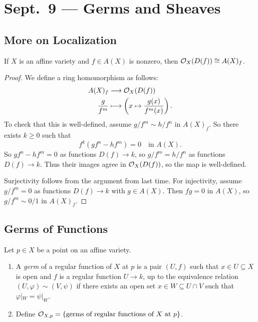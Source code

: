 \chapter{Sept.~9 --- Germs and Sheaves}

\section{More on Localization}
\begin{prop}
  If $X$ is an affine variety and
  $f \in A(X)$ is nonzero, then
  $\mathcal{O}_X(D(f)) \cong A(X)_f$.
\end{prop}

\begin{proof}
  We define a ring homomorphism as follows:
  \begin{align*}
    A(X)_f &\longrightarrow \mathcal{O}_X(D(f)) \\
    \frac{g}{f^m} &\longmapsto \left( x \mapsto \frac{g(x)}{f^m(x)} \right).
  \end{align*}
  To check that this is well-defined,
  assume $g / f^m \sim h / f^n$ in
  $A(X)_f$. So there exists $k \ge 0$
  such that
  \[
    f^k (g f^n - h f^m) = 0
    \quad \text{in } A(X).
  \]
  So $gf^n - hf^m = 0$ as functions
  $D(f) \to k$, so $g / f^m = h / f^n$
  as functions $D(f) \to k$. Thus
  their images agree in $\mathcal{O}_X(D(f))$, so
  the map is well-defined.

  Surjectivity follows from the argument
  from last time. For injectivity, assume
  $g / f^m = 0$ as functions
  $D(f) \to k$ with $g \in A(X)$.
  Then $fg = 0$ in $A(X)$, so
$g / f^m \sim 0 / 1$ in $A(X)_f$.
\end{proof}

\section{Germs of Functions}

\begin{definition}
  Let $p \in X$ be a point on an
  affine variety.
  \begin{enumerate}
    \item A \emph{germ} of a regular
      function of $X$ at $p$ is a pair
      $(U, f)$ such that $x \in U \subseteq X$
      is open and $f$ is a regular
      function $U \to k$, up to the
      equivalence relation
      $(U, \varphi) \sim (V, \psi)$
      if there exists an open
      set $x \in W \subseteq U \cap V$
      such that $\varphi|_W = \psi|_W$.
    \item Define
      $\mathcal{O}_{X, p} = \{\text{germs of regular functions of $X$ at $p$}\}$.
  \end{enumerate}
\end{definition}

